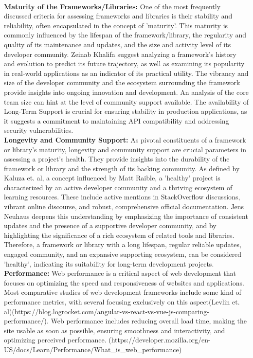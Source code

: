 \\\textbf{Maturity of the Frameworks/Libraries:}
One of the most frequently discussed criteria for assessing frameworks and libraries is their stability and reliability, often encapsulated in the concept of 'maturity'. This maturity is commonly influenced by the lifespan of the framework/library, the regularity and quality of its maintenance and updates, and the size and activity level of its developer community.
Zeinab Khalifa suggest analyzing a framework's history and evolution to predict its future trajectory, as well as examining its popularity in real-world applications as an indicator of its practical utility. The vibrancy and size of the developer community and the ecosystem surrounding the framework provide insights into ongoing innovation and development.
An analysis of the core team size can hint at the level of community support available. The availability of Long-Term Support is crucial for ensuring stability in production applications, as it suggests a commitment to maintaining API compatibility and addressing security vulnerabilities.
\\\textbf{Longevity and Community Support:}
As pivotal constituents of a framework or library's maturity, longevity and community support are crucial parameters in assessing a project's health. They provide insights into the durability of the framework or library and the strength of its backing community. As defined by Kaluza et. al, a concept influenced by Matt Raible, a 'healthy' project is characterized by an active developer community and a thriving ecosystem of learning resources. These include active mentions in StackOverflow discussions, vibrant online discourse, and robust, comprehensive official documentation. Jens Neuhaus deepens this understanding by emphasizing the importance of consistent updates and the presence of a supportive developer community, and by highlighting the significance of a rich ecosystem of related tools and libraries. Therefore, a framework or library with a long lifespan, regular reliable updates, engaged community, and an expansive supporting ecosystem, can be considered 'healthy', indicating its suitability for long-term development projects.
\\\textbf{Performance:}
Web performance is a critical aspect of web development that focuses on optimizing the speed and responsiveness of websites and applications. Most comparative studies of web development frameworks include some kind of performance metrics, with several focusing exclusively on this aspect(Levlin et. al)(https://blog.logrocket.com/angular-vs-react-vs-vue-js-comparing-performance/). Web performance includes reducing overall load time, making the site usable as soon as possible, ensuring smoothness and interactivity, and optimizing perceived performance. (https://developer.mozilla.org/en-US/docs/Learn/Performance/What_is_web_performance)
